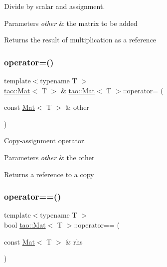 Divide by scalar and assignment. 


\begin{DoxyParams}{Parameters}
{\em other} & the matrix to be added \\
\hline
\end{DoxyParams}
\begin{DoxyReturn}{Returns}
the result of multiplication as a reference 
\end{DoxyReturn}
\mbox{\label{classtao_1_1_mat_adf9adc1479a4276601212e9399b18776}} 
\subsubsection{\texorpdfstring{operator=()}{operator=()}}
{\footnotesize\ttfamily template$<$typename T $>$ \\
\mbox{\hyperlink{classtao_1_1_mat}{tao\+::\+Mat}}$<$ T $>$ \& \mbox{\hyperlink{classtao_1_1_mat}{tao\+::\+Mat}}$<$ T $>$\+::operator= (\begin{DoxyParamCaption}\item[{const \mbox{\hyperlink{classtao_1_1_mat}{Mat}}$<$ T $>$ \&}]{other }\end{DoxyParamCaption})}



Copy-\/assignment operator. 


\begin{DoxyParams}{Parameters}
{\em other} & the other \\
\hline
\end{DoxyParams}
\begin{DoxyReturn}{Returns}
a reference to a copy 
\end{DoxyReturn}
\mbox{\label{classtao_1_1_mat_a81150ed4254e70ab1f3058f159ad2218}} 
\subsubsection{\texorpdfstring{operator==()}{operator==()}}
{\footnotesize\ttfamily template$<$typename T $>$ \\
bool \mbox{\hyperlink{classtao_1_1_mat}{tao\+::\+Mat}}$<$ T $>$\+::operator== (\begin{DoxyParamCaption}\item[{const \mbox{\hyperlink{classtao_1_1_mat}{Mat}}$<$ T $>$ \&}]{rhs }\end{DoxyParamCaption})}



